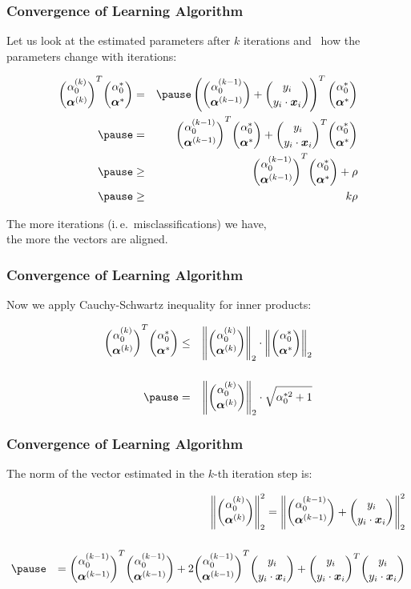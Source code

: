 \begin{frame}
  \frametitle{Convergence of Learning Algorithm \cont}

  Let us look at the estimated parameters after $k$ iterations and \
  how the parameters change with iterations:

  \begin{eqnarray*}
    {\alpha_0^{(k)} \choose \vec \alpha^{(k)}}^T{\alpha_0^* \choose \vec \alpha^*} 
      &=& \pause \left( { \alpha_0^{(k-1)} \choose \vec \alpha^{(k-1)}} +  {y_i \choose y_i\cdot \vec x_i}\right)^T {\alpha_0^* \choose \vec \alpha^*}\\ \pause
      &=& { \alpha_0^{(k-1)} \choose \vec \alpha^{(k-1)}} ^T{\alpha_0^* \choose \vec \alpha^*} +  {y_i \choose y_i\cdot \vec x_i}^T {\alpha_0^* \choose \vec \alpha^*} \\ \pause
      &\geq& { \alpha_0^{(k-1)} \choose \vec \alpha^{(k-1)}} ^T{\alpha_0^* \choose \vec \alpha^*} + \rho \\ \pause
      &\geq& k\rho
  \end{eqnarray*}

   The more iterations (i.\,e.\ misclassifications) we have, \\
  the more the vectors are aligned.
\end{frame}


\begin{frame}
  \frametitle{Convergence of Learning Algorithm \cont}

  Now we apply Cauchy-Schwartz inequality for inner products:

  \begin{eqnarray*}
    {\alpha_0^{(k)} \choose \vec \alpha^{(k)}}^T{\alpha_0^* \choose \vec \alpha^*} 
      &\leq& \left\|  {\alpha_0^{(k)} \choose \vec \alpha^{(k)}}\right\|_2\cdot  \left\| {\alpha_0^* \choose \vec \alpha^*}\right\|_2 \\[.5cm] \pause
      &=&\left \|  {\alpha_0^{(k)} \choose \vec \alpha^{(k)}}\right\|_2\cdot  \sqrt{\alpha_0^{*2}+1}
  \end{eqnarray*}
\end{frame}


\begin{frame}
  \frametitle{Convergence of Learning Algorithm \cont}

  The norm of the vector estimated in the $k$-th iteration step is:

  \begin{eqnarray*}
    & &  \left \|  {\alpha_0^{(k)} \choose \vec \alpha^{(k)}}\right\|_2^2 =
   \left\| { \alpha_0^{(k-1)} \choose \vec \alpha^{(k-1)}} +  {y_i \choose y_i\cdot \vec x_i}\right\|_2^2 \\[.5cm] \pause
   & & \vspace*{-2cm} = { \alpha_0^{(k-1)} \choose \vec \alpha^{(k-1)}} ^T{ \alpha_0^{(k-1)} \choose \vec \alpha^{(k-1)}} 
           + 2 { \alpha_0^{(k-1)} \choose \vec \alpha^{(k-1)}}^T{y_i \choose y_i\cdot \vec x_i}
          + {y_i \choose y_i\cdot \vec x_i}^T{y_i \choose y_i\cdot \vec x_i}
  \end{eqnarray*}
\end{frame}



